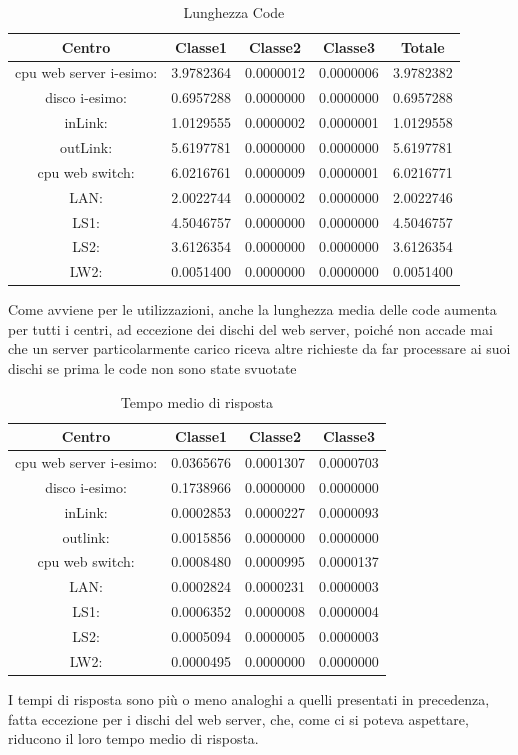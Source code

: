 \begin{table}[htbp]
\begin{center}
\begin{tabular}{|c|c|c|c|c|}
\hline
Centro &Classe1 &Classe2 &Classe3 &Totale\\
\hline
\hline
 cpu web server i-esimo: 	&3.9782364	&0.0000012	&0.0000006	&3.9782382\\
\hline
 disco i-esimo: 	&0.6957288	&0.0000000	&0.0000000	&0.6957288\\
\hline
 inLink: 	&1.0129555	&0.0000002	&0.0000001	&1.0129558\\
\hline
 outLink: 	&5.6197781	&0.0000000	&0.0000000	&5.6197781\\
\hline
 cpu web switch: 	&6.0216761	&0.0000009	&0.0000001	&6.0216771\\
\hline
 LAN: 	&2.0022744	&0.0000002	&0.0000000	&2.0022746\\
\hline
 LS1: 	&4.5046757	&0.0000000	&0.0000000	&4.5046757\\
\hline
 LS2: 	&3.6126354	&0.0000000	&0.0000000	&3.6126354\\
\hline
 LW2: 	&0.0051400	&0.0000000	&0.0000000	&0.0051400\\
\hline
\end{tabular}
\end{center}
\caption{Lunghezza Code}
\label{lunghezzacode}
\end{table}
Come avviene per le utilizzazioni, anche la lunghezza media delle code aumenta per tutti i centri, ad eccezione dei dischi del web server, poiché non accade mai che un server particolarmente carico riceva altre richieste da far processare ai suoi dischi se prima le code non sono state svuotate
\begin{table}[htbp]
\begin{center}
\begin{tabular}{|c|c|c|c|}
\hline
Centro &Classe1 &Classe2 &Classe3\\
\hline
\hline
 cpu web server i-esimo: 	&0.0365676	&0.0001307	&0.0000703\\
\hline
 disco i-esimo: 	&0.1738966	&0.0000000	&0.0000000\\
\hline
 inLink: 	&0.0002853	&0.0000227	&0.0000093\\
\hline
 outlink: 	&0.0015856	&0.0000000	&0.0000000\\
\hline
 cpu web switch: 	&0.0008480	&0.0000995	&0.0000137\\
\hline
 LAN: 	&0.0002824	&0.0000231	&0.0000003\\
\hline
 LS1: 	&0.0006352	&0.0000008	&0.0000004\\
\hline
 LS2: 	&0.0005094	&0.0000005	&0.0000003\\
\hline
 LW2: 	&0.0000495	&0.0000000	&0.0000000\\
\hline
\end{tabular}
\end{center}
\caption{Tempo medio di risposta}
\label{tempomediodirisposta}
\end{table}
I tempi di risposta sono più o meno analoghi a quelli presentati in precedenza, fatta eccezione per i dischi del web server, che, come ci si poteva aspettare, riducono il loro tempo medio di risposta.
